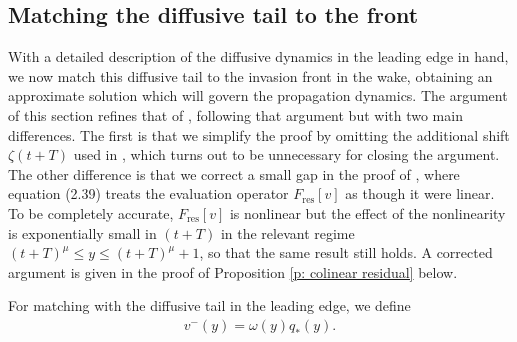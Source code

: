 \documentclass[11pt]{article}
\numberwithin{equation}{section}
\numberwithin{prop}{section}
\begin{document}
\subsection{Matching the diffusive tail to the front}\label{s: colinear matching}
With a detailed description of the diffusive dynamics in the leading edge in hand, we now match this diffusive tail to the invasion front in the wake, obtaining an approximate solution which will govern the propagation dynamics. The argument of this section refines that of \cite[Section 2.3]{CAMS}, following that argument but with two main differences. The first is that we simplify the proof by omitting the additional shift $\zeta(t+T)$ used in \cite{CAMS}, which turns out to be unnecessary for closing the argument. The other difference is that we correct a small gap in the proof of \cite[Proposition 2.5]{CAMS}, where equation (2.39) treats the evaluation operator $F_\mathrm{res} [v]$ as though it were linear. To be completely accurate, $F_\mathrm{res}[v]$ is nonlinear but the effect of the nonlinearity is exponentially small in $(t+T)$ in the relevant regime $(t+T)^\mu \leq y \leq (t+T)^\mu + 1$, so that the same result still holds. A corrected argument is given in the proof of Proposition \ref{p: colinear residual} below. 

For matching with the diffusive tail in the leading edge, we define 
\begin{align}
v^-(y) = \omega(y) q_*(y). 
\end{align}
\end{document}
